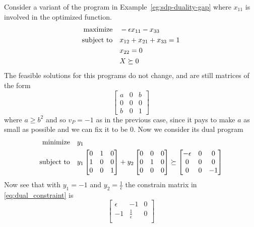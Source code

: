 \documentclass[a4paper,twoside,justified]{tufte-handout}
\begin{document}
\begin{example}\label{eg:sdp-close-gap}
  Consider a variant of the program in
  Example~\ref{eg:sdp-duality-gap} where $ x_{11} $ is involved in the
  optimized function.
  \begin{alignat}{2}
    \text{maximize}\hspace{1em}& -\epsilon x_{11} -x_{33}\\
    \text{subject to}\hspace{1em}& x_{12} + x_{21} + x_{33} = 1\\
    & x_{22}=0\\
    & X \succeq 0
  \end{alignat}
  The feasible solutions for this programs do not change, and are
  still matrices of the form
  \begin{equation}
    \begin{bmatrix}
      a & 0 & b\\
      0 & 0 & 0\\
      b & 0 & 1
    \end{bmatrix}
  \end{equation}
  where $ a \geq b^{2} $ and so $ v_{P}=-1$ as in the previous case,
  since it pays to make $ a$ as small as possible and we can fix it to
  be $ 0 $. Now we consider its dual program
  \begin{alignat}{2}
    \minimize y_{1}\\
    \subjectto y_{1} \begin{bmatrix}
      0 & 1 & 0\\
      1 & 0 & 0\\
      0 & 0 & 1
    \end{bmatrix} + 
    y_{2} \begin{bmatrix}
      0 & 0 & 0\\
      0 & 1 & 0\\
      0 & 0 & 0
    \end{bmatrix} 
    \succeq 
    \begin{bmatrix}
      -\epsilon & 0 & 0\\
      0 & 0 & 0\\
      0 & 0 & -1
    \end{bmatrix}\label{eq:dual_constraint}
  \end{alignat}
  Now see that with $ y_{1}=-1 $ and $ y_{2}= \frac{1}{\epsilon} $ the
  constrain matrix in \eqref{eq:dual_constraint} is
  \begin{equation}
    \begin{bmatrix}
      \epsilon & -1 & 0\\
      -1 & \frac{1}{\epsilon} & 0\\

\end{bmatrix}
\end{equation}
\end{example}
\end{document}
